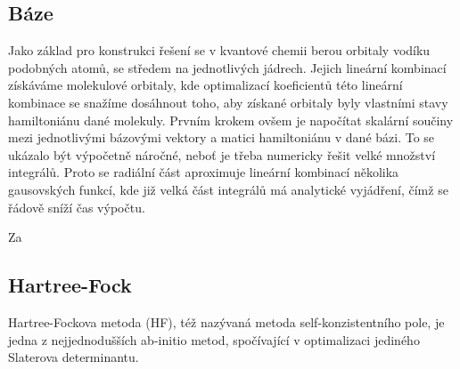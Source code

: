 \subsection{Báze}
Jako základ pro konstrukci řešení se v kvantové chemii berou orbitaly vodíku podobných 
atomů, se středem na jednotlivých jádrech. Jejich lineární kombinací získáváme 
molekulové orbitaly, kde optimalizací koeficientů této lineární kombinace se snažíme 
dosáhnout toho, aby získané orbitaly byly vlastními stavy hamiltoniánu dané molekuly.
Prvním krokem ovšem je napočítat skalární součiny mezi jednotlivými bázovými vektory a 
matici hamiltoniánu v dané bázi. To se ukázalo být výpočetně náročné, neboť je třeba 
numericky řešit velké množství integrálů. Proto se radiální část aproximuje lineární 
kombinací několika gausovských funkcí, kde již velká část integrálů má analytické 
vyjádření, čímž se řádově sníží čas výpočtu.

Za 
\subsection{Hartree-Fock}
Hartree-Fockova metoda (HF), též nazývaná metoda self-konzistentního pole, je jedna z 
nejjednodušších ab-initio metod, spočívající v optimalizaci jediného Slaterova 
determinantu. 
